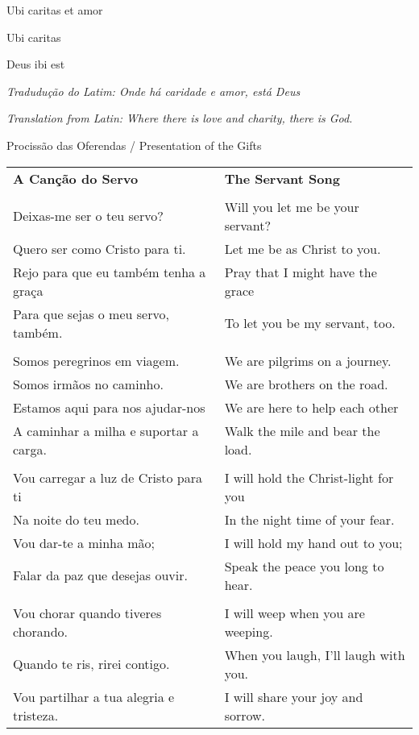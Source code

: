 Ubi caritas et amor

Ubi caritas

Deus ibi est

\vspace{5pt}

{\it Tradudução do Latim: Onde há caridade e amor, está Deus}

{\it Translation from Latin: Where there is love and charity, there is God.}

\vspace{20pt}

{\large Procissão das Oferendas / Presentation of the Gifts}

\begin{longtable}{p{2.1in}p{2in}}
\textbf{A Canção do Servo} & \textbf{The Servant Song}\\
\\
Deixas-me ser o teu servo? & Will you let me be your servant?\\
Quero ser como Cristo para ti. & Let me be as Christ to you.\\
Rejo para que eu também tenha a graça & Pray that I might have the grace\\
Para que sejas o meu servo, também. & To let you be my servant, too.\\
\\
Somos peregrinos em viagem. & We are pilgrims on a journey.\\
Somos irmãos no caminho. & We are brothers on the road.\\
Estamos aqui para nos ajudar-nos & We are here to help each other\\
A caminhar a milha e suportar a carga. & Walk the mile and bear the load.\\
\\
Vou carregar a luz de Cristo para ti & I will hold the Christ-light for you\\
Na noite do teu medo. & In the night time of your fear.\\
Vou dar-te a minha mão; & I will hold my hand out to you;\\
Falar da paz que desejas ouvir. & Speak the peace you long to hear.\\
\\
Vou chorar quando tiveres chorando. & I will weep when you are weeping.\\
Quando te ris, rirei contigo. & When you laugh, I'll laugh with you.\\
Vou partilhar a tua alegria e tristeza. & I will share your joy and sorrow.\\

\end{longtable}
